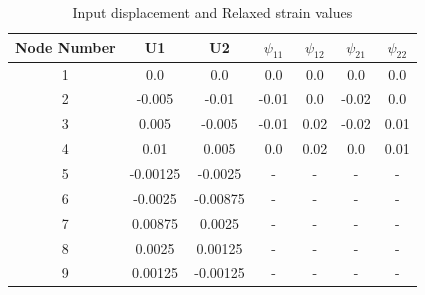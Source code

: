 \documentclass[12pt]{article}
\begin{document}
\begin{table}
\begin{center}
	\begin{tabular}{||c c c c c c c||} 
		\hline
		Node Number & U1 & U2 & $\psi_{11}$ & $\psi_{12}$ & $\psi_{21}$ & $\psi_{22}$\\ [0.8ex] 
		\hline\hline
		1 & 0.0 & 0.0 & 0.0 & 0.0 & 0.0 & 0.0  \\ 
		[0.8ex]
		\hline
		2 & -0.005 & -0.01 & -0.01 & 0.0 & -0.02 & 0.0  \\ 
		[0.8ex]
		\hline
		3 & 0.005 & -0.005 & -0.01 & 0.02 & -0.02 & 0.01  \\ 
		[0.8ex]
		\hline
		4 & 0.01 & 0.005 & 0.0 & 0.02 & 0.0 & 0.01  \\ 
		[0.8ex]
		\hline
		5 & -0.00125 & -0.0025 & - & - & - & -  \\ 
		[0.8ex]
		\hline
		6 & -0.0025 & -0.00875 & - & - & - & - \\ 
		[0.8ex]
		\hline
		7 & 0.00875 & 0.0025 & - & - & - & - \\ 
		[0.8ex]
		\hline
		8 & 0.0025 & 0.00125 & - & - & - & - \\ 
		[0.8ex]
		\hline		
		9 & 0.00125 & -0.00125 & - & - & - & -\\  [0.8ex] 
		\hline
	\end{tabular}
	\caption{Input displacement and Relaxed strain values}
\end{center}
\end{table}
\end{document}
